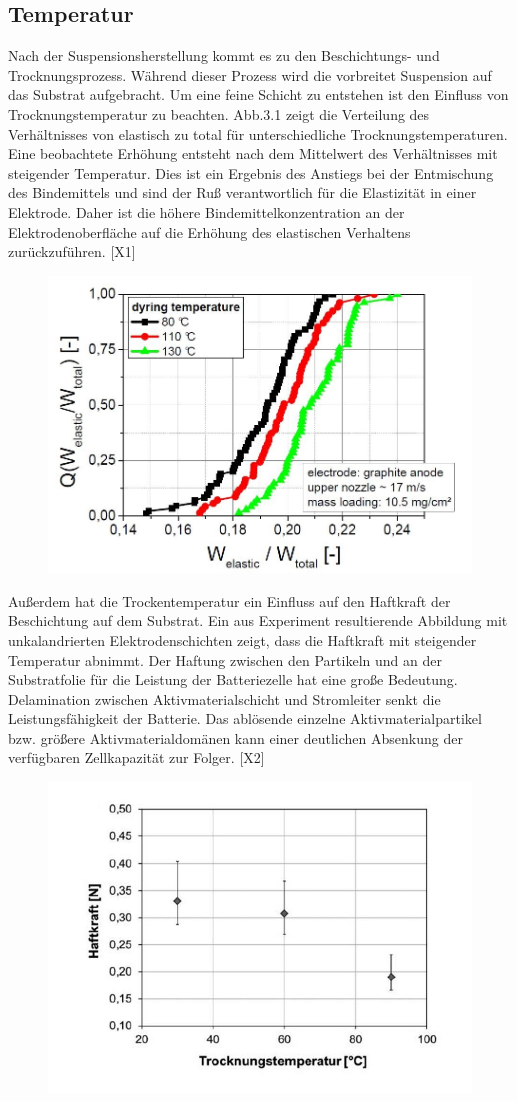 \documentclass[12pt,UTF8]{article}
\def\celsius{\ensuremath{^\circ\hspace{-0.09em}\mathrm{C}}}
\begin{document}
\subsection{Temperatur}
Nach der Suspensionsherstellung kommt es zu den Beschichtungs- und Trocknungsprozess. Während dieser Prozess wird die vorbreitet Suspension auf das Substrat aufgebracht. Um eine feine Schicht zu entstehen ist den Einfluss von Trocknungstemperatur zu beachten.
Abb.3.1 zeigt die Verteilung des Verhältnisses von elastisch zu total für unterschiedliche Trocknungstemperaturen. Eine beobachtete Erhöhung entsteht nach dem Mittelwert des Verhältnisses mit steigender Temperatur. Dies ist ein Ergebnis des Anstiegs bei der Entmischung des Bindemittels und sind der Ruß verantwortlich für die Elastizität in einer Elektrode. Daher ist die höhere Bindemittelkonzentration an der Elektrodenoberfläche auf die Erhöhung des elastischen Verhaltens zurückzuführen. [X1]
\begin{figure}[H]
    \centering
    \includegraphics[width=.5\linewidth]{Diagramme/fig3_2_1.jpg}
    \caption{}
\end{figure}

Außerdem hat die Trockentemperatur ein Einfluss auf den Haftkraft der Beschichtung auf dem Substrat. Ein aus Experiment resultierende Abbildung mit unkalandrierten Elektrodenschichten zeigt, dass die Haftkraft mit steigender Temperatur abnimmt. Der Haftung zwischen den Partikeln und an der Substratfolie für die Leistung der Batteriezelle hat eine große Bedeutung. Delamination zwischen Aktivmaterialschicht und Stromleiter senkt die Leistungsfähigkeit der Batterie. Das ablösende einzelne Aktivmaterialpartikel bzw. größere Aktivmaterialdomänen kann einer deutlichen Absenkung der verfügbaren Zellkapazität zur Folger. [X2]
\begin{figure}[H]
    \centering
    \includegraphics[width=.5\linewidth]{Diagramme/fig3_2_2.jpg}
    \caption{}
\end{figure}
\end{document}
